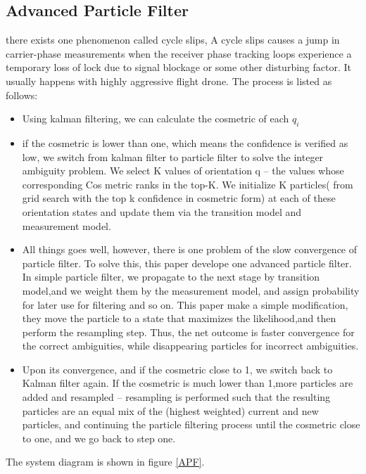 \documentclass[journal,onecolumn]{IEEEtran}
\begin{document}
\subsection{Advanced Particle Filter}
there exists one phenomenon called cycle slips, A cycle slips causes a jump in
carrier-phase measurements when the receiver phase tracking loops experience a
temporary loss of lock due to signal blockage or some other disturbing factor.
It usually happens with highly aggressive flight drone. The process is listed as follows:
\begin{itemize}
\item Using kalman filtering, we can calculate the cosmetric of each $q_i$
\item if the cosmetric is lower than one, which means the confidence is verified as low,
we switch from kalman filter to particle filter to solve the integer ambiguity problem.
We select K values of orientation q – the values whose corresponding Cos metric ranks
in the top-K. We initialize K particles( from grid search with the top k confidence in
cosmetric form) at each of these orientation states and update them via the transition
model and measurement model.

\item All things goes well, however, there is one problem of the slow convergence
of particle filter. To solve this, this paper develope one advanced particle filter.
In simple particle filter, we propagate to the next stage by transition model,and we
weight them by the measurement model, and assign probability for later use for filtering
and so on. This paper make a simple modification, they move the particle to a state that
maximizes the likelihood,and then perform the resampling step. Thus, the net outcome is
faster convergence for the correct ambiguities, while disappearing particles for incorrect
ambiguities.

\item Upon its convergence, and if the cosmetric close to 1, we switch back to Kalman
filter again.  If the cosmetric is much lower than 1,more particles are added
and resampled – resampling is performed such that the resulting particles are
an equal mix of the (highest weighted) current and new particles, and continuing
the particle filtering process until the cosmetric close to one, and we go back to step one.
\end{itemize}
The system diagram is shown in figure \ref{APF}.
\end{document}
